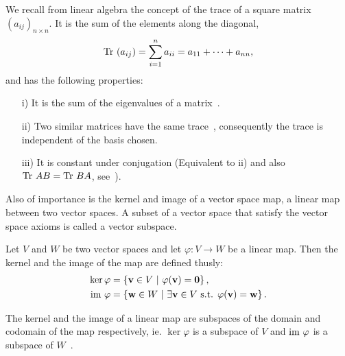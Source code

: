 		We recall from linear algebra the concept of the trace of a square matrix $(a_{ij})_{n \times n}$. It is the sum of the elements along the diagonal,
		\begin{align*}
			\text{Tr }(a_{ij})= \sum_{i=1}^{n} a_{ii} = a_{11} + \dots + a_{nn},
		\end{align*}
		and has the following properties:
		\begin{proposition}\label{prop:trace}
			\begin{enumerate}
				\item[i)] It is the sum of the eigenvalues of a matrix~\cite[Cor.8.6.1.]{Nicholson}.
				\item[ii)] Two similar matrices have the same trace~\cite[Thm.5.5.1.]{Nicholson}, consequently the trace is independent of the basis chosen.
				\item[iii)] It is constant under conjugation (Equivalent to ii) and also $\text{Tr } AB = \text{Tr } BA$, see~\cite[Ex.2.3.30.]{Nicholson}).
			\end{enumerate}
		\end{proposition}


	Also of importance is the kernel and image of a vector space map, a linear map between two vector spaces. A subset of a vector space that satisfy the vector space axioms is called a vector subspace. 
		
	\begin{definition}\label{def:kernelimage}
		Let $V$ and $W$ be two vector spaces and let $\varphi: V \rightarrow W$ be a linear map. Then the kernel and the image of the map are defined thusly:
		\begin{align*}
			 \ker \varphi &= \left\lbrace \mathbf{v} \in V \ \middle\vert \ \varphi(\mathbf{v}) = \mathbf{0} \right\rbrace, \\  \text{im } \varphi &= \left\lbrace \mathbf{w} \in W \ \middle\vert \ \exists \mathbf{v} \in V \text{ s.t. } \varphi(\mathbf{v}) = \mathbf{w} \right\rbrace.
		\end{align*}
	\end{definition}
	
	\begin{remark}
		The kernel and the image of a linear map are subspaces of the domain and codomain of the map respectively, ie. $\ker \varphi$ is a subspace of $V$ and $\text{im } \varphi$ is a subspace of $W$~\cite[Sect.5.4.]{Holst}.
	\end{remark}	
	
